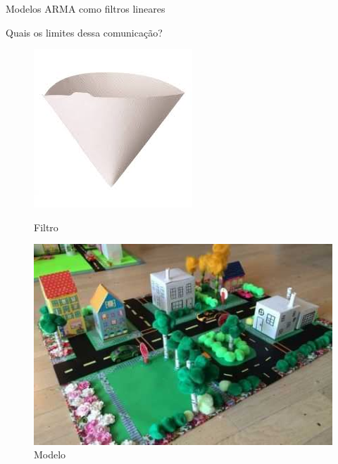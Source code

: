 \documentclass [xcolor=svgnames, t] {beamer}
\begin{document}
\begin{frame}{Modelos ARMA como filtros lineares}

\hspace{1cm}Quais os limites dessa comunicação?

\begin{figure}[!tbp]
  \centering
  \begin{minipage}[b]{0.4\textwidth}
    \includegraphics[width=\textwidth]{filtro.jpeg}
    \caption{Filtro}
  \end{minipage}
  \hfill
  \begin{minipage}[b]{0.4\textwidth}
    \includegraphics[width=\textwidth]{modelo.jpg}
    \caption{Modelo}
  \end{minipage}
\end{figure}

\end{frame}
\end{document}
